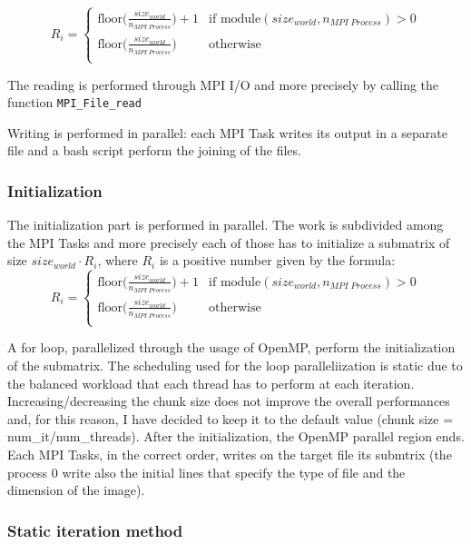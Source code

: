 \documentclass[
  letterpaper,
  DIV=11,
  numbers=noendperiod]{scrartcl}
\begin{document}
\[
R_i = 
\begin{cases}
\text{floor}\bigg(\frac{size_{world}}{n_{MPI \; Process}}\bigg)+1 & \text{if module}(size_{world},n_{MPI \; Process}) > 0 \\
\text{floor}\bigg(\frac{size_{world}}{n_{MPI \; Process}}\bigg) & \text{otherwise} \\
\end{cases}
\]

The reading is performed through MPI I/O and more precisely by calling
the function \texttt{MPI\_File\_read}

Writing is performed in parallel: each MPI Task writes its output in a
separate file and a bash script perform the joining of the files.

\hypertarget{initialization}{%
\subsubsection{Initialization}\label{initialization}}

The initialization part is performed in parallel. The work is subdivided
among the MPI Tasks and more precisely each of those has to initialize a
submatrix of size \(size_{world}\cdot R_i\), where \(R_i\) is a positive
number given by the formula: \[
R_i = 
\begin{cases}
\text{floor}\bigg(\frac{size_{world}}{n_{MPI \; Process}}\bigg)+1 & \text{if module}(size_{world},n_{MPI \; Process}) > 0 \\
\text{floor}\bigg(\frac{size_{world}}{n_{MPI \; Process}}\bigg) & \text{otherwise} \\
\end{cases}
\]

A for loop, parallelized through the usage of OpenMP, perform the
initialization of the submatrix. The scheduling used for the loop
paralleliization is static due to the balanced workload that each thread
has to perform at each iteration. Increasing/decreasing the chunk size
does not improve the overall performances and, for this reason, I have
decided to keep it to the default value (chunk size =
num\_it/num\_threads). After the initialization, the OpenMP parallel
region ends. Each MPI Tasks, in the correct order, writes on the target
file its submtrix (the process 0 write also the initial lines that
specify the type of file and the dimension of the image).

\hypertarget{static-iteration-method}{%
\subsubsection{Static iteration method}\label{static-iteration-method}}
\end{document}
